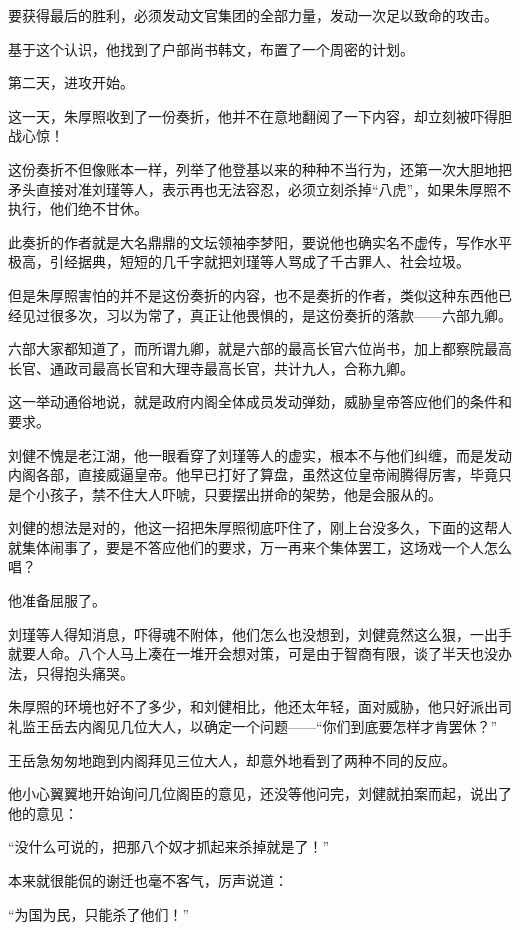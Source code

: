 \begin{multicols}{\theparacolNo}
要获得最后的胜利，必须发动文官集团的全部力量，发动一次足以致命的攻击。

基于这个认识，他找到了户部尚书韩文，布置了一个周密的计划。

第二天，进攻开始。

这一天，朱厚照收到了一份奏折，他并不在意地翻阅了一下内容，却立刻被吓得胆战心惊！

这份奏折不但像账本一样，列举了他登基以来的种种不当行为，还第一次大胆地把矛头直接对准刘瑾等人，表示再也无法容忍，必须立刻杀掉“八虎”，如果朱厚照不执行，他们绝不甘休。

此奏折的作者就是大名鼎鼎的文坛领袖李梦阳，要说他也确实名不虚传，写作水平极高，引经据典，短短的几千字就把刘瑾等人骂成了千古罪人、社会垃圾。

但是朱厚照害怕的并不是这份奏折的内容，也不是奏折的作者，类似这种东西他已经见过很多次，习以为常了，真正让他畏惧的，是这份奏折的落款——六部九卿。

六部大家都知道了，而所谓九卿，就是六部的最高长官六位尚书，加上都察院最高长官、通政司最高长官和大理寺最高长官，共计九人，合称九卿。

这一举动通俗地说，就是政府内阁全体成员发动弹劾，威胁皇帝答应他们的条件和要求。

刘健不愧是老江湖，他一眼看穿了刘瑾等人的虚实，根本不与他们纠缠，而是发动内阁各部，直接威逼皇帝。他早已打好了算盘，虽然这位皇帝闹腾得厉害，毕竟只是个小孩子，禁不住大人吓唬，只要摆出拼命的架势，他是会服从的。

刘健的想法是对的，他这一招把朱厚照彻底吓住了，刚上台没多久，下面的这帮人就集体闹事了，要是不答应他们的要求，万一再来个集体罢工，这场戏一个人怎么唱？

他准备屈服了。

刘瑾等人得知消息，吓得魂不附体，他们怎么也没想到，刘健竟然这么狠，一出手就要人命。八个人马上凑在一堆开会想对策，可是由于智商有限，谈了半天也没办法，只得抱头痛哭。

朱厚照的环境也好不了多少，和刘健相比，他还太年轻，面对威胁，他只好派出司礼监王岳去内阁见几位大人，以确定一个问题——“你们到底要怎样才肯罢休？”

王岳急匆匆地跑到内阁拜见三位大人，却意外地看到了两种不同的反应。

他小心翼翼地开始询问几位阁臣的意见，还没等他问完，刘健就拍案而起，说出了他的意见：

“没什么可说的，把那八个奴才抓起来杀掉就是了！”

本来就很能侃的谢迁也毫不客气，厉声说道：

“为国为民，只能杀了他们！”


\end{multicols}

